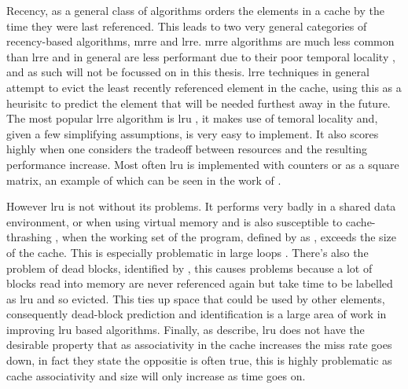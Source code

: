 Recency, as a general class of algorithms orders the elements in a cache by the time they were last referenced. This leads to two very general categories of recency-based algorithms, \gls{mrre} and \gls{lrre}. \gls{mrre} algorithms are much less common than \gls{lrre} and in general are less performant due to their poor temporal locality \cite{pandaSurveyReplacementStrategies2016}, and as such will not be focussed on in this thesis. \gls{lrre} techniques in general attempt to evict the least recently referenced element in the cache, using this as a heurisitc to predict the element that will be needed furthest away in the future. The most popular \gls{lrre} algorithm is \gls{lru} \cite{pitkowSimpleRobustCaching1994, karedlaCachingStrategiesImprove1994, smithCacheMemories1982}, it makes use of temoral locality and, given a few simplifying assumptions, is very easy to implement. It also scores highly when one considers the tradeoff between resources and the resulting performance increase. Most often \gls{lru} is implemented with counters or as a square matrix, an example of which can be seen in the work of \citet{acklandSinglechip6billion16b2000}. 

However \gls{lru} is not without its problems. It performs very badly in a shared data environment, or when using virtual memory \cite{bansalCARClockAdaptive2004} and is also susceptible to cache-thrashing \cite{denningThrashingItsCauses1968}, when the working set of the program, defined by \citet{denningWorkingSetModel1968} as , exceeds the size of the cache. This is especially problematic in large loops \cite{linPredictingLastTouchReferences2002}. There's also the problem of dead blocks, identified by \citet{liuCacheBurstsNew2008a}, this causes problems because a lot of blocks read into memory are never referenced again but take time to be labelled as \gls{lru} and so evicted. This ties up space that could be used by other elements, consequently dead-block prediction and identification is a large area of work in improving \gls{lru} based algorithms. Finally, as \citet{linPredictingLastTouchReferences2002} describe, \gls{lru} does not have the desirable property that as associativity in the cache increases the miss rate goes down, in fact they state the oppositie is often true, this is highly problematic as cache associativity and size will only increase as time goes on.


